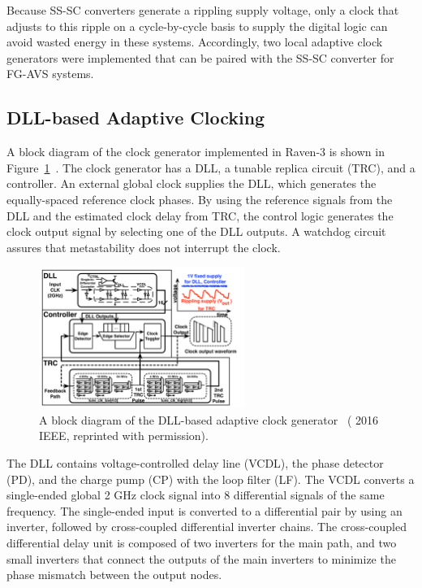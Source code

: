 \documentclass[graybox]{svmult}
\begin{document}
Because SS-SC converters generate a rippling supply voltage, only a clock that adjusts to this ripple on a cycle-by-cycle basis to supply the digital logic can avoid wasted energy in these systems.
Accordingly, two local adaptive clock generators were implemented that can be paired with the SS-SC converter for FG-AVS systems.

\subsection{DLL-based Adaptive Clocking}

A block diagram of the clock generator implemented in Raven-3 is shown in Figure~\ref{fig:clockgen-block}~\cite{Kwak2016}.
The clock generator has a DLL, a tunable replica circuit (TRC), and a controller.
An external global clock supplies the DLL, which generates the equally-spaced reference clock phases.
By using the reference signals from the DLL and the estimated clock delay from TRC, the control logic generates the clock output signal by selecting one of the DLL outputs.
A watchdog circuit assures that metastability does not interrupt the clock.

\begin{figure}
  \centering
  \includegraphics[width=0.6\textwidth]{clockgen-block}
  \caption{A block diagram of the DLL-based adaptive clock generator~\cite{Zimmer2016} ({\textcopyright} 2016 IEEE, reprinted with permission).}
  \label{fig:clockgen-block}
\end{figure}

The DLL contains voltage-controlled delay line (VCDL), the phase detector (PD), and the charge pump (CP) with the loop filter (LF).
The VCDL converts a single-ended global 2 GHz clock signal into 8 differential signals of the same frequency.
The single-ended input is converted to a differential pair by using an inverter, followed by cross-coupled differential inverter chains.
The cross-coupled differential delay unit is composed of two inverters for the main path, and two small inverters that connect the outputs of the main inverters to minimize the phase mismatch between the output nodes.
\end{document}
